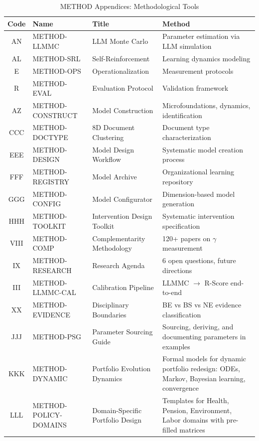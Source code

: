 \begin{table}[htbp]
\centering
\caption{METHOD Appendices: Methodological Tools}
\label{tab:index-method}
\renewcommand{\arraystretch}{1.4}
\begin{tabular}{@{}cllp{5cm}@{}}
\toprule
\textbf{Code} & \textbf{Name} & \textbf{Title} & \textbf{Method} \\
\midrule
AN & METHOD-LLMMC & LLM Monte Carlo & Parameter estimation via LLM simulation \\
AL & METHOD-SRL & Self-Reinforcement & Learning dynamics modeling \\
E & METHOD-OPS & Operationalization & Measurement protocols \\
R & METHOD-EVAL & Evaluation Protocol & Validation framework \\
AZ & METHOD-CONSTRUCT & Model Construction & Microfoundations, dynamics, identification \\
CCC & METHOD-DOCTYPE & 8D Document Clustering & Document type characterization \\
EEE & METHOD-DESIGN & Model Design Workflow & Systematic model creation process \\
FFF & METHOD-REGISTRY & Model Archive & Organizational learning repository \\
GGG & METHOD-CONFIG & Model Configurator & Dimension-based model generation \\
HHH & METHOD-TOOLKIT & Intervention Design Toolkit & Systematic intervention specification \\
VIII & METHOD-COMP & Complementarity Methodology & 120+ papers on $\gamma$ measurement \\
IX & METHOD-RESEARCH & Research Agenda & 6 open questions, future directions \\
III & METHOD-LLMMC-CAL & Calibration Pipeline & LLMMC $\rightarrow$ R-Score end-to-end \\
XX & METHOD-EVIDENCE & Disciplinary Boundaries & BE vs BS vs NE evidence classification \\
JJJ & METHOD-PSG & Parameter Sourcing Guide & Sourcing, deriving, and documenting parameters in examples \\
KKK & METHOD-DYNAMIC & Portfolio Evolution Dynamics & Formal models for dynamic portfolio redesign: ODEs, Markov, Bayesian learning, convergence \\
LLL & METHOD-POLICY-DOMAINS & Domain-Specific Portfolio Design & Templates for Health, Pension, Environment, Labor domains with pre-filled matrices \\

\end{tabular}
\end{table}
